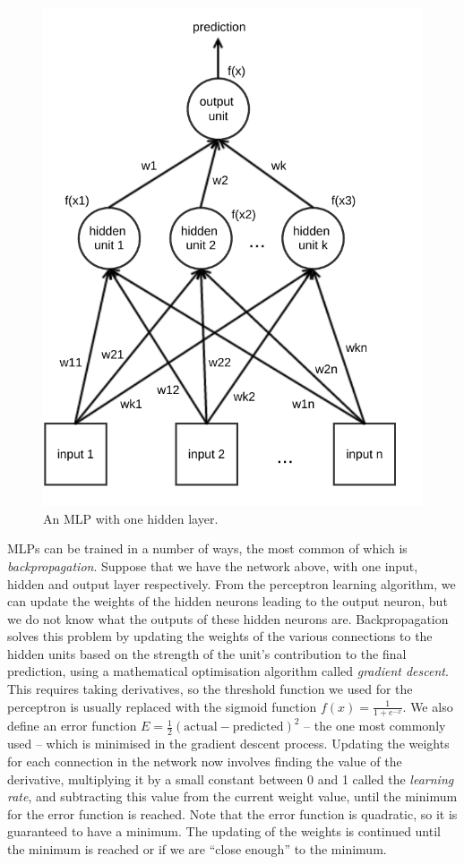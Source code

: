\begin{figure}[h]
\centering
\includegraphics{images/method/mlp.pdf}
\caption{An MLP with one hidden layer.}
\label{fig:mlp}
\end{figure}

MLPs can be trained in a number of ways, the most common of which is
\textit{backpropagation}. Suppose that we have the network above, with one
input, hidden and output layer respectively. From the perceptron learning
algorithm, we can update the weights of the hidden neurons leading to the
output neuron, but we do not know what the outputs of these hidden neurons are.
Backpropagation solves this problem by updating the weights of the various
connections to the hidden units based on the strength of the unit's
contribution to the final prediction, using a mathematical optimisation
algorithm called \textit{gradient descent}. This requires taking derivatives,
so the threshold function we used for the perceptron is usually replaced with
the sigmoid function $f(x) = \frac{1}{1+e^{-x}}$. We also define an error
function $E=\frac{1}{2}(\text{actual} - \text{predicted})^2$ -- the one most
commonly used -- which is
minimised in the gradient descent process. Updating the weights for each
connection in the network now involves finding the value of the derivative,
multiplying it by a small constant between 0 and 1 called the
\textit{learning rate}, and subtracting this value from the current weight
value, until the minimum for the error function is reached. Note that the
error function is quadratic, so it is guaranteed to have a minimum. The
updating of the weights is continued until the minimum is reached or if we
are ``close enough'' to the minimum.

